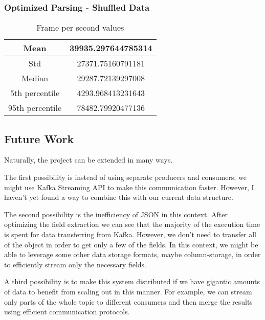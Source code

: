 \documentclass[letterpaper]{article}
\begin{document}
\subsubsection{Optimized Parsing - Shuffled Data}

\begin{table}[ht]
\begin{tabular}{|c|c|}
    \hline
    Mean            & 39935.297644785314 \\
    \hline
    Std             & 27371.75160791181 \\
    \hline
    Median          & 29287.72139297008 \\
    \hline
    5th percentile  & 4293.968413231643 \\
    \hline
    95th percentile & 78482.79920477136 \\
    \hline
\end{tabular}
\caption{Frame per second values}
\end{table}

\subsection{Future Work}
Naturally, the project can be extended in many ways.

The first possibility is instead of using separate producers and consumers, we might use Kafka Streaming API to make
this communication faster. However, I haven't yet found a way to combine this with our current data structure.

The second possibility is the inefficiency of JSON in this context. After optimizing the field extraction we can see
that the majority of the execution time is spent for data transferring from Kafka. However, we don't need to transfer all
of the object in order to get only a few of the fields. In this context, we might be able to leverage some other data storage
formats, maybe column-storage, in order to efficiently stream only the necessary fields.

A third possibility is to make this system distributed if we have gigantic amounts of data to benefit from scaling out in this
manner. For example, we can stream only parts of the whole topic to different consumers and then merge the results using
efficient communication protocols.
\end{document}
